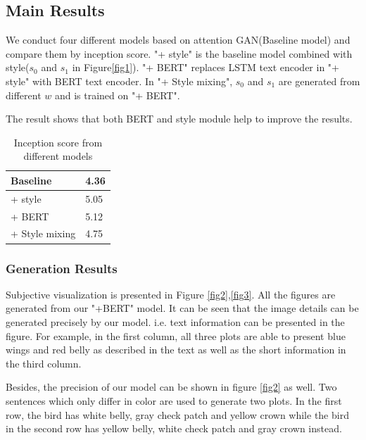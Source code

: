 \documentclass{article}
\begin{document}
\subsection{Main Results}

We conduct four different models based on attention GAN(Baseline model) and compare them by inception score.
"+ style" is the baseline model combined with style($s_0$ and $s_1$ in Figure\ref{fig1}).
"+ BERT" replaces LSTM text encoder in "+ style"  with BERT text encoder.
In "+ Style mixing", $s_0$ and $s_1$ are generated from different $w$ and is trained on "+ BERT".

The result shows that both BERT and style module help to improve the results.

\begin{table}[h!]
\centering
\begin{tabular}{ | p{2cm} || p{1cm} | } 
\hline
Baseline & 4.36  \\ 
\hline
+ style & 5.05 \\ 
\hline
+ BERT & 5.12 \\ 
\hline
+ Style mixing & 4.75 \\ 
\hline
\end{tabular}
\caption{Inception score from different models}
\label{table:1}
\end{table}

\subsubsection{Generation Results}

Subjective visualization is presented in Figure \ref{fig2},\ref{fig3}. All the figures are generated from our "+BERT" model. 
It can be seen that the image details can be generated precisely by our model. i.e. text information can be presented in the figure. For example, in the first column, all three plots are able to present blue wings and red belly as described in the text as well as the short information in the third column.

Besides, the precision of our model can be shown in figure \ref{fig2} as well. Two sentences which only differ in color are used to generate two plots. In the first row, the bird has white belly, gray check patch and yellow crown while the bird in the second row has yellow belly, white check patch and gray crown instead.
\end{document}
